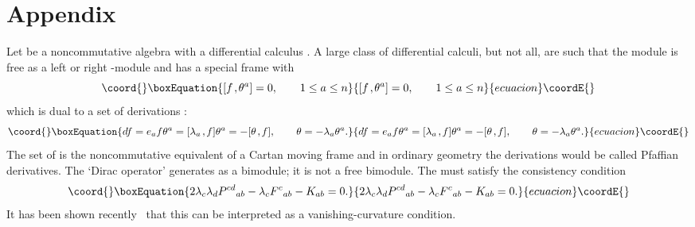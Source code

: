 \documentclass[a4paper,12pt]{article}
\def\ad{\mbox{ad}\,}
\def\c#1{{\cal #1}}
\def\k{\kern-.1em\mathbin{,}\kern-.1em}
\providecommand{\initiate}{\setcounter{equation}{0}}
\begin{document}
\initiate
\section{Appendix} 

Let \myHighlight{$\c{A}$}\coordHE{} be a noncommutative algebra with a differential calculus
\myHighlight{$\Omega^*(\c{A})$}\coordHE{}.  A large class of differential calculi, but not
all, are such that the module \myHighlight{$\Omega^1(\c{A})$}\coordHE{} is free as a left or
right \myHighlight{$\c{A}$}\coordHE{}-module and has a special frame \coordHE{} with
\begin{equation}\coord{}\boxEquation{
[f\k \theta^a] = 0, \qquad 1 \leq a \leq n                 \label{frame}
}{
[f\k \theta^a] = 0, \qquad 1 \leq a \leq n                 }{ecuacion}\coordE{}\end{equation}
which is dual to a set of derivations \myHighlight{$e_a = \ad \lambda_a$}\coordHE{}:
\begin{equation}\coord{}\boxEquation{
df = e_a f \theta^a = [\lambda_a\k f] \theta^a = 
- [\theta\k f], \qquad \theta = -\lambda_a \theta^a.         \label{dual}
}{
df = e_a f \theta^a = [\lambda_a\k f] \theta^a = 
- [\theta\k f], \qquad \theta = -\lambda_a \theta^a.         }{ecuacion}\coordE{}\end{equation}
The set of \coordHE{} is the noncommutative equivalent of a Cartan
moving frame and in ordinary geometry the derivations \coordHE{} would be
called Pfaffian derivatives. The `Dirac operator' \myHighlight{$\theta$}\coordHE{} generates
\myHighlight{$\Omega^1(\c{A})$}\coordHE{} as a bimodule; it is not a free bimodule.  The
\coordHE{} must satisfy the consistency condition~\cite{DimMad96}
\begin{equation}\coord{}\boxEquation{
2 \lambda_c \lambda_d P^{cd}{}_{ab} - 
\lambda_c F^c{}_{ab} - K_{ab} = 0.                           \label{fund-eq}
}{
2 \lambda_c \lambda_d P^{cd}{}_{ab} - 
\lambda_c F^c{}_{ab} - K_{ab} = 0.                           }{ecuacion}\coordE{}\end{equation}
It has been shown recently~\cite{MadSchSchWes00a} that this can be
interpreted as a vanishing-curvature condition.
\end{document}
